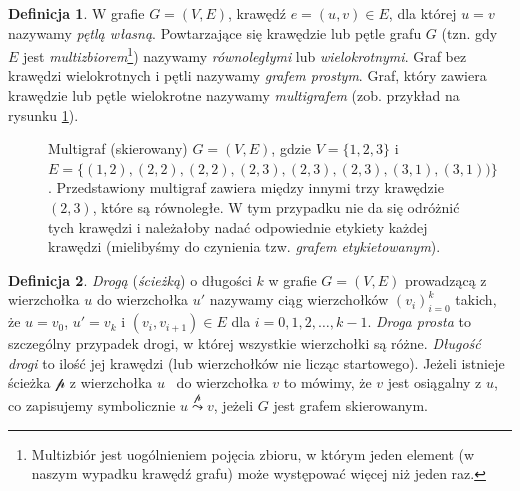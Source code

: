 \documentclass[12pt,a4paper]{book}
\theoremstyle{definition}
\newtheorem{de}{Definicja}[chapter]
\newcommand{\p}{{\mathcal p}}
\numberwithin{equation}{chapter}
\begin{document}
\begin{de}
W grafie $G=(V,E)$, krawędź $e = (u,v)\in E$, dla której $u=v$ nazywamy \textit{pętlą własną}. 
Powtarzające się krawędzie lub pętle grafu $G$ (tzn. gdy $E$ jest \textit{multizbiorem}\footnote{Multizbiór jest uogólnieniem pojęcia zbioru, w którym jeden element (w naszym wypadku krawędź grafu) może występować więcej niż jeden raz.}) nazywamy \textit{równoległymi} lub \textit{wielokrotnymi}. Graf bez krawędzi wielokrotnych i pętli nazywamy \textit{grafem prostym}. Graf, który zawiera krawędzie lub pętle wielokrotne nazywamy \textit{multigrafem} (zob. przykład na rysunku \ref{rys_multigraf}).
\end{de}

\begin{figure}[!htp]
\centering
{}
\caption{
Multigraf (skierowany) $G =(V,E)$, gdzie $V = \{1,2,3\}$ i~$E = \big\{(1,2),(2,2),(2,2),(2,3),(2,3),(2,3),(3,1),(3,1))\big\}$. Przedstawiony multigraf  zawiera między innymi trzy krawędzie $(2,3)$, które są równoległe. W tym przypadku nie da się odróżnić tych krawędzi i należałoby nadać odpowiednie etykiety każdej krawędzi (mielibyśmy do czynienia tzw. \textit{grafem etykietowanym}).}
\label{rys_multigraf}
\end{figure}

\begin{de}
\textit{Drogą} (\textit{ścieżką}) o długości $k$ w grafie $G = (V,E)$ prowadzącą z wierzchołka $u$ do wierzchołka $u'$ nazywamy ciąg wierzchołków $(v_i)_{i=0}^{k}$ takich, że $u = v_0$, $u'= v_k$ i $(v_i, v_{i+1}) \in E$ dla $i = 0,1,2,\dots, k-1$. \textit{Droga prosta} to szczególny przypadek drogi, w której wszystkie wierzchołki są różne. \textit{Długość drogi} to ilość jej krawędzi (lub wierzchołków nie licząc startowego).  Jeżeli istnieje ścieżka $\p$ z wierzchołka $u$~ do wierzchołka $v$ to mówimy, że $v$ jest osiągalny z $u$, co zapisujemy symbolicznie $u\stackrel{\p}{\leadsto}v$, jeżeli $G$ jest grafem skierowanym.
\end{de}
\end{document}
